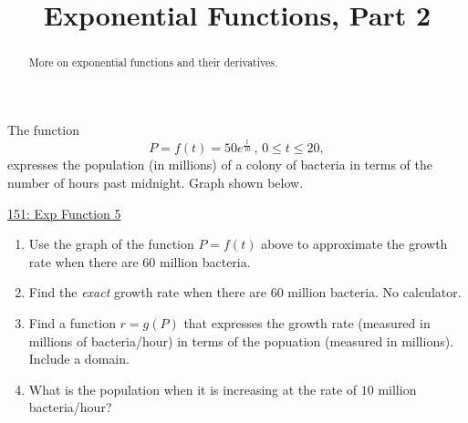 \documentclass{ximera}
\title{Exponential Functions, Part 2}
\begin{document}
\begin{abstract}
More on exponential functions and their derivatives.
\end{abstract}
\maketitle


\begin{question} \label{Q677543345}
The function 
\[
     P = f(t) = 50 e^{\frac{t}{10}} \, , \, 0\leq t \leq 20 ,
\]
expresses the population (in millions) of a colony of bacteria in terms of the number of hours past  midnight. Graph shown below.

\begin{onlineOnly}
    \begin{center}
\end{center}
\end{onlineOnly}

\href{https://www.desmos.com/calculator/kffjsoepmo}{151: Exp Function 5}


\begin{enumerate}

\item Use the graph of the function $P=f(t)$ above to approximate the growth rate when there are $60$ million bacteria.

\item Find the \emph{exact} growth rate when there are $60$ million bacteria. No calculator.

\item Find a function $r=g(P)$ that expresses the growth rate (measured in millions of bacteria/hour) in terms of the popuation (measured in millions). Include a domain.

\item What is the population when it is increasing at the rate of $10$ million bacteria/hour?

\end{enumerate}
\end{question}
\end{document}
